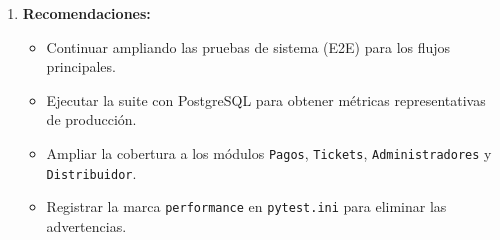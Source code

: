 \documentclass[12pt,a4paper]{article}
\begin{document}
\begin{enumerate}
  \item \textbf{Recomendaciones:}
        \begin{itemize}
          \item Continuar ampliando las pruebas de sistema (E2E) para los flujos principales.
          \item Ejecutar la suite con PostgreSQL para obtener métricas representativas de producción.
          \item Ampliar la cobertura a los módulos \texttt{Pagos}, \texttt{Tickets},
                \texttt{Administradores} y \texttt{Distribuidor}.
          \item Registrar la marca \texttt{performance} en \texttt{pytest.ini} para eliminar
                las advertencias.
        \end{itemize}
\end{enumerate}
\end{document}
